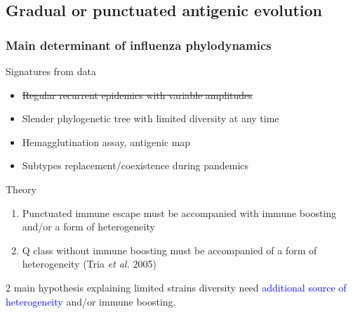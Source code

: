\documentclass{beamer}
\begin{document}
\subsection{Gradual or punctuated antigenic evolution}

\begin{frame}
  \frametitle{Main determinant of influenza phylodynamics}

  \begin{block}{Signatures from data}
    \begin{itemize}
    \item \alert{\sout{Regular recurrent epidemics with variable amplitudes}}
    \item Slender phylogenetic tree with limited diversity at any time
    \item Hemagglutination assay, antigenic map
    \item Subtypes replacement/coexistence during pandemics
    \end{itemize}
  \end{block}
  
\pause

  \begin{block}{Theory}
    \begin{enumerate}
    \item \alert{Punctuated immune escape must be accompanied with immune
      boosting and/or a form of heterogeneity}
    \item Q class without immune boosting must be accompanied of a
      form of heterogeneity (Tria \textit{et al.} 2005)
    \end{enumerate}
  \end{block}

\pause

  \begin{alertblock}{}
    2 main hypothesis explaining limited strains diversity need
    \textcolor{blue}{additional source of heterogeneity} and/or
    \alert{immune boosting}.
  \end{alertblock}

\end{frame}
\end{document}
